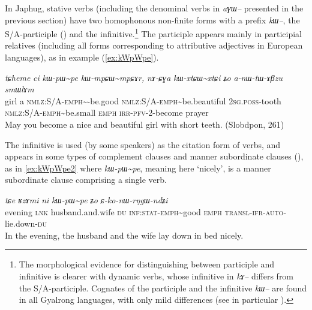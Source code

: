 \documentclass[oldfontcommands,oneside,a4paper,11pt]{article}
\newcommand{\ipa}[1]{{\phon\textit{#1}}} %
\newcommand{\tld}{\textasciitilde{}}
\begin{document}
In Japhug, stative verbs (including the denominal verbs in \ipa{aɣɯ--} presented in the previous section) have two homophonous non-finite forms with a prefix \ipa{kɯ--}, the S/A-participle (\citealt[5]{jacques14antipassive}) and the infinitive.\footnote{The morphological evidence for distinguishing between participle and infinitive is clearer with dynamic verbs, whose infinitive in \ipa{kɤ--} differs from the S/A-participle. Cognates of the participle and the infinitive \ipa{kɯ--} are found in all Gyalrong languages, with only mild differences (see in particular \citealt{sun14generic}).} The participle appears mainly in participial relatives (including all forms corresponding to attributive adjectives in European languages), as in example (\ref{ex:kWpWpe}).

\begin{exe}
\ex \label{ex:kWpWpe}
\gll
\ipa{tɕheme} 	\ipa{ci} 	\ipa{kɯ-pɯ\tld{}pe} 	\ipa{kɯ-mpɕɯ\tld{}mpɕɤr,} 	\ipa{nɤ-ɕɣa} 	\ipa{kɯ-xtɕɯ\tld{}xtɕi} 	\ipa{ʑo} 	\ipa{a-nɯ-tɯ-ɤβzu} 	\ipa{smɯlɤm}  \\
girl a \textsc{nmlz:S/A-emph}\tld{}-be.good \textsc{nmlz:S/A-emph}\tld{}be.beautiful  \textsc{2sg.poss}-tooth \textsc{nmlz:S/A-emph}\tld{}be.small \textsc{emph} \textsc{irr-pfv}-2-become prayer \\
\glt May you become a nice and beautiful girl with short teeth. (Slobdpon, 261)
\end{exe}

The infinitive is used (by some speakers) as the citation form of verbs, and appears in some types of complement clauses and manner subordinate clauses (\citealt[271-2; 321-5]{jacques14linking}), as in \ref{ex:kWpWpe2} where \ipa{kɯ-pɯ\tld{}pe}, meaning here `nicely', is a manner subordinate clause comprising a single verb.
 \begin{exe}
\ex \label{ex:kWpWpe2}
\gll \ipa{ɕɤr} 	\ipa{tɕe} 	\ipa{ʁzɤmi} 	\ipa{ni} 	\ipa{kɯ-pɯ\tld{}pe} 	\ipa{ʑo} 	\ipa{ɕ-ko-nɯ-rŋgɯ-ndʑi}  \\
evening \textsc{lnk} husband.and.wife \textsc{du} \textsc{inf:stat-emph}\tld{}good \textsc{emph} \textsc{transl-ifr-auto}-lie.down-\textsc{du} \\
\glt In the evening, the husband and the wife lay down in bed nicely.
\end{exe}

\end{document}
